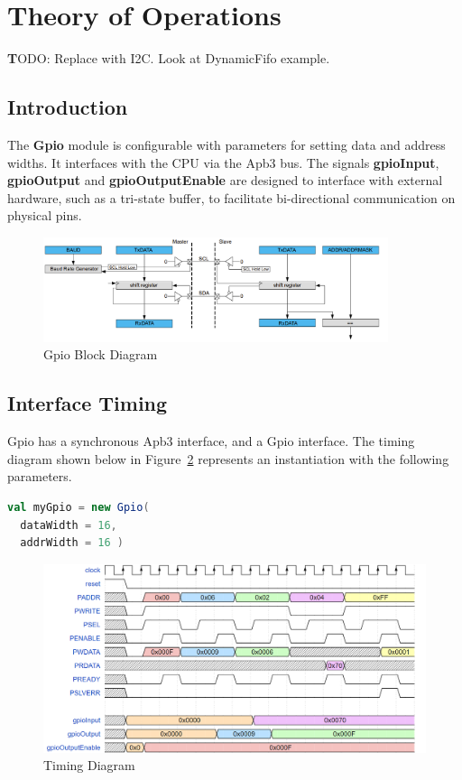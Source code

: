 \section{Theory of Operations}
\textbf TODO: Replace with I2C. Look at DynamicFifo example.
\subsection{Introduction}
The \textbf{Gpio} module is configurable with parameters for setting data and address widths. It interfaces with the CPU via the Apb3 bus. The signals \textbf{gpioInput}, \textbf{gpioOutput} and \textbf{gpioOutputEnable} are designed to interface with external hardware, such as a tri-state buffer, to facilitate bi-directional communication on physical pins.

\begin{figure}[h]
  \includegraphics[width=0.90\textwidth]{images/i2c_block_diagram.png}
  \caption{Gpio Block Diagram}\label{fig:block-diagram}
\end{figure}

\newpage
\subsection{Interface Timing}

Gpio has a synchronous Apb3 interface, and a Gpio interface. The timing diagram shown below
in Figure~\ref{fig:timing} represents an instantiation with the following
parameters.

\begin{lstlisting}[language=Scala]
val myGpio = new Gpio(
  dataWidth = 16, 
  addrWidth = 16 ) 
\end{lstlisting}

\begin{figure}[h]
  \includegraphics[width=\textwidth]{images/Gpio-timing.png}
  \caption{Timing Diagram}\label{fig:timing}
\end{figure}

